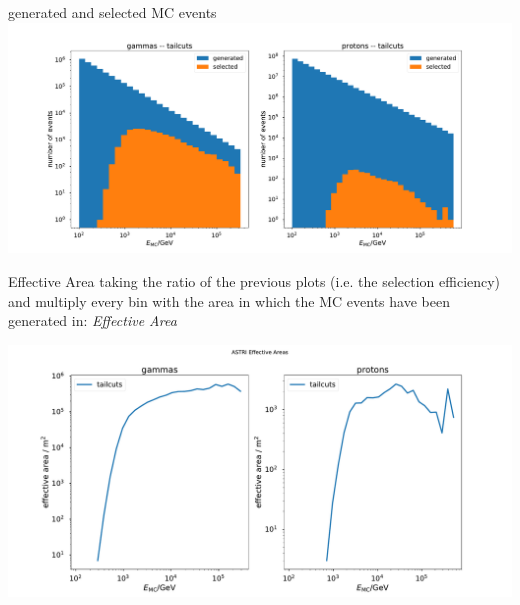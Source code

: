 \documentclass[8pt]{beamer}
\begin{document}
    \begin{frame}{generated and selected MC events}
        \centering
        \includegraphics[trim=3cm 0 4cm 0,clip, width=1.\textwidth]
                                                            {pics/NEvents_vs_energy_MC}

    \end{frame}


    \begin{frame}{Effective Area}
        taking the ratio of the previous plots (i.e. the selection efficiency) and
        multiply every bin with the area in which the MC events have been generated in:
        \emph{Effective Area}\vspace{5mm}

        \centering
        \includegraphics[trim=2cm 0 3cm 1cm, clip, width=\textwidth]{pics/effective_areas}

    \end{frame}
\end{document}
